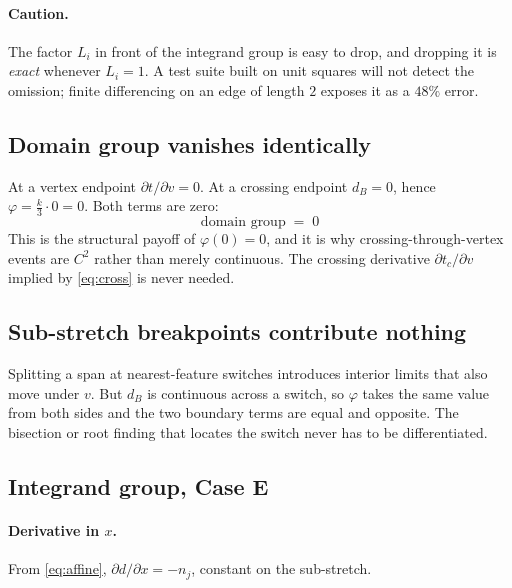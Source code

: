 \documentclass[11pt]{article}
\begin{document}
\paragraph{Caution.} The factor $L_i$ in front of the integrand group is easy to drop, and dropping it is \emph{exact} whenever $L_i = 1$. A test suite built on unit squares will not detect the omission; finite differencing on an edge of length $2$ exposes it as a $48\%$ error.

\subsection{Domain group vanishes identically}
\label{sec:domain}

At a vertex endpoint $\partial t/\partial v = 0$. At a crossing endpoint $d_B = 0$, hence $\varphi = \tfrac{k}{3}\cdot 0 = 0$. Both terms are zero:
\begin{equation}
\boxed{\;\text{domain group} \;=\; 0\;}
\label{eq:domainzero}
\end{equation}
This is the structural payoff of $\varphi(0) = 0$, and it is why crossing-through-vertex events are $C^2$ rather than merely continuous. The crossing derivative $\partial t_c/\partial v$ implied by \eqref{eq:cross} is never needed.

\subsection{Sub-stretch breakpoints contribute nothing}
\label{sec:breakpoints}

Splitting a span at nearest-feature switches introduces interior limits that also move under $v$. But $d_B$ is continuous across a switch, so $\varphi$ takes the same value from both sides and the two boundary terms are equal and opposite. The bisection or root finding that locates the switch never has to be differentiated.

\subsection{Integrand group, Case E}

\paragraph{Derivative in $x$.} From \eqref{eq:affine}, $\partial d/\partial x = -n_j$, constant on the sub-stretch.
\end{document}
